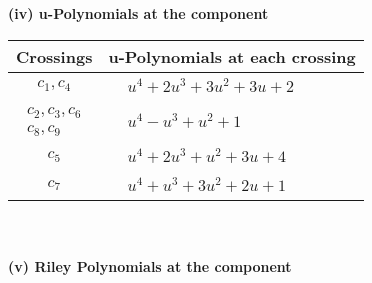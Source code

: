\documentclass[1p]{elsarticle_modified}
\theoremstyle{definition}
\begin{document}
\newpage\renewcommand{\arraystretch}{1}
\flushleft \textbf{(iv) u-Polynomials at the component}\newline \\
\begin{tabular}{m{50pt}|m{274pt}}
Crossings & \hspace{64pt}u-Polynomials at each crossing \\
\hline $$\begin{aligned}c_{1},c_{4}\end{aligned}$$&$\begin{aligned}
&u^4+2 u^3+3 u^2+3 u+2
\end{aligned}$\\
\hline $$\begin{aligned}c_{2},c_{3},c_{6}\\c_{8},c_{9}\end{aligned}$$&$\begin{aligned}
&u^4- u^3+u^2+1
\end{aligned}$\\
\hline $$\begin{aligned}c_{5}\end{aligned}$$&$\begin{aligned}
&u^4+2 u^3+u^2+3 u+4
\end{aligned}$\\
\hline $$\begin{aligned}c_{7}\end{aligned}$$&$\begin{aligned}
&u^4+u^3+3 u^2+2 u+1
\end{aligned}$\\
\hline
\end{tabular}\\~\\
\newpage\renewcommand{\arraystretch}{1}
\flushleft \textbf{(v) Riley Polynomials at the component}\newline \\
\end{document}

